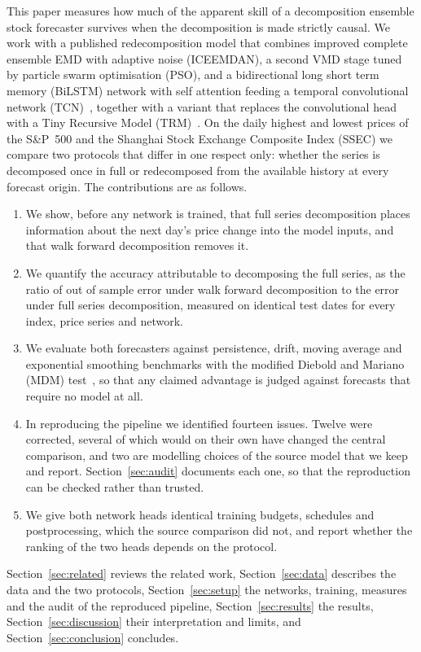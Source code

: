\documentclass[pdflatex,sn-mathphys-num]{sn-jnl}%
\theoremstyle{thmstyleone}%
\theoremstyle{thmstyletwo}%
\theoremstyle{thmstylethree}%
\begin{document}
This paper measures how much of the apparent skill of a decomposition ensemble
stock forecaster survives when the decomposition is made strictly causal. We
work with a published redecomposition model that combines improved complete
ensemble EMD with adaptive noise (ICEEMDAN), a second VMD stage tuned by
particle swarm optimisation (PSO), and a bidirectional long short term memory
(BiLSTM) network with self attention feeding a temporal convolutional network
(TCN)~\cite{gong2024}, together with a variant that replaces the convolutional
head with a Tiny Recursive Model (TRM)~\cite{jolicoeur2025}. On the daily
highest and lowest prices of the S\&P~500 and the Shanghai Stock Exchange
Composite Index (SSEC) we compare two protocols that differ in one respect
only: whether the series is decomposed once in full or redecomposed from the
available history at every forecast origin. The contributions are as follows.
\begin{enumerate}
\item We show, before any network is trained, that full series decomposition
places information about the next day's price change into the model inputs,
and that walk forward decomposition removes it.
\item We quantify the accuracy attributable to decomposing the full series,
as the ratio of out of sample error under walk forward decomposition to the
error under full series decomposition, measured on identical test dates for
every index, price series and network.
\item We evaluate both forecasters against persistence, drift, moving average
and exponential smoothing benchmarks with the modified Diebold and Mariano
(MDM) test~\cite{hewamalage2022,mdmindex2023}, so that any claimed advantage is
judged against forecasts that require no model at all.
\item In reproducing the pipeline we identified fourteen issues. Twelve were
corrected, several of which would on their own have changed the central
comparison, and two are modelling choices of the source model that we keep
and report. Section~\ref{sec:audit} documents each one, so that the
reproduction can be checked rather than trusted.
\item We give both network heads identical training budgets, schedules and
postprocessing, which the source comparison did not, and report whether the
ranking of the two heads depends on the protocol.
\end{enumerate}
Section~\ref{sec:related} reviews the related work, Section~\ref{sec:data}
describes the data and the two protocols, Section~\ref{sec:setup} the
networks, training, measures and the audit of the reproduced pipeline,
Section~\ref{sec:results} the results, Section~\ref{sec:discussion} their
interpretation and limits, and Section~\ref{sec:conclusion} concludes.
\end{document}
